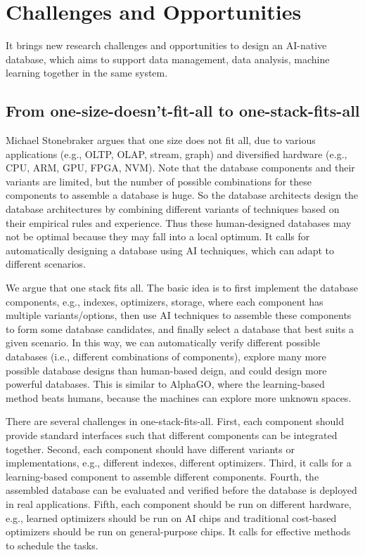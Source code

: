 
\section{Challenges and Opportunities}
\label{sec: challenge}

It brings new research challenges and opportunities to design an AI-native database, which aims to support data management, data analysis, machine learning together in the same system.

\subsection{From one-size-doesn't-fit-all to one-stack-fits-all}

Michael Stonebraker argues that one size does not fit all, due to various applications (e.g., OLTP, OLAP, stream, graph) and diversified hardware (e.g., CPU, ARM, GPU, FPGA, NVM). Note that the database components and their variants are limited, but the number of possible combinations for these components to assemble a database is huge. So the database architects design the database architectures by combining different variants of techniques based on their empirical rules and experience. Thus these human-designed databases may not be optimal because they may fall into a local optimum. It calls for automatically designing a database using AI techniques, which can adapt to different scenarios. 


We argue that one stack fits all. The basic idea is to first implement the database components, e.g., indexes, optimizers, storage, where each component has multiple variants/options, then use AI techniques to assemble these components to form some database candidates, and finally select a database that best suits a given scenario. In this way, we can automatically verify different possible databases (i.e., different combinations of components), explore many more possible database designs than human-based deign, and could design more powerful databases. This is similar to AlphaGO, where the learning-based method beats humans, because the machines can explore more unknown spaces. 


There are several challenges in one-stack-fits-all. First, each component should provide standard interfaces such that different components can be integrated together. Second, each component should have different variants or implementations, e.g., different indexes, different optimizers. Third, it calls for a learning-based component to assemble different components. Fourth, the assembled database can be evaluated and verified before the database is deployed in real applications.  Fifth, each component should be run on different hardware, e.g., learned optimizers should be run on AI chips and traditional cost-based optimizers should be run on general-purpose chips. It calls for effective methods to schedule the tasks. 


